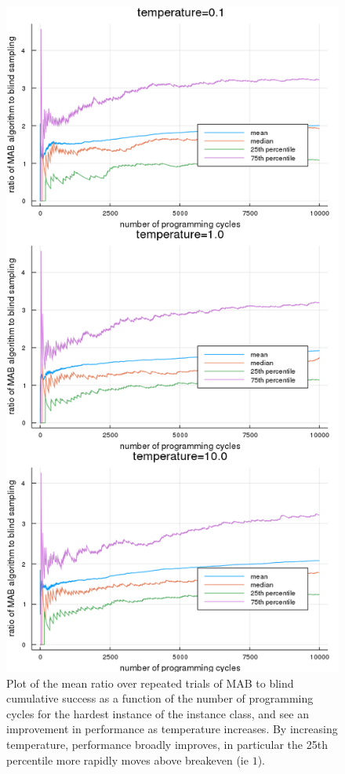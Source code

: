 \begin{figure}
    \includegraphics[width=0.8\columnwidth]{boltzmann_inst3_air_eps_comp.png}
    \caption{Plot of the mean ratio over repeated trials of MAB to blind cumulative success as a function of the number of programming cycles for the hardest instance of the instance class, and see an improvement in performance as temperature increases. By increasing temperature, performance broadly improves, in particular the 25th percentile more rapidly moves above breakeven (ie $1$).}
    \label{fig:boltzmann_inst3_air_eps_comp}
\end{figure}

